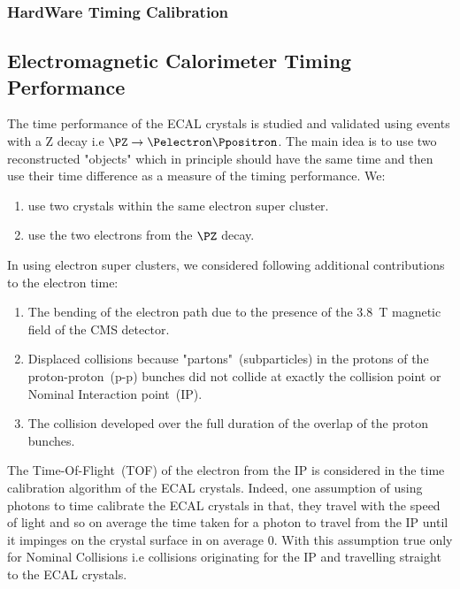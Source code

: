 \subsubsection{HardWare Timing Calibration}


\subsection{Electromagnetic Calorimeter Timing Performance}
The time performance of the ECAL crystals is studied and validated using events with a Z decay  i.e $\PZ \rightarrow \Pelectron \Ppositron$. 
\newline
The main idea is to use two reconstructed "objects" which in principle should have the same time and then use their time difference as a measure of the timing performance. We:
\begin{enumerate}
\item use two crystals within the same electron super cluster.
\item use the two electrons from the $\PZ$ decay. 
\end{enumerate}
In using electron super clusters, we considered following additional contributions to the electron time:
\begin{enumerate}
\item The bending of the electron path due to the presence of the 3.8~T magnetic field of the CMS detector.
\item  Displaced collisions  because "partons"~(subparticles) in the protons of the proton-proton~(p-p) bunches did not collide at exactly the collision point or Nominal Interaction point~(IP).
\item The collision developed over the full duration of the overlap of the proton bunches.
\end{enumerate}

The Time-Of-Flight~(TOF) of the electron from the IP is considered in the time calibration algorithm of the ECAL crystals.
Indeed, one assumption of using photons to time calibrate the ECAL crystals in that, they travel with the speed of light and so on average the time taken for a photon to travel from the IP until it impinges on the crystal surface in on average 0. With this assumption true only for Nominal Collisions i.e collisions originating for the IP and travelling straight to the ECAL crystals.
\newline


